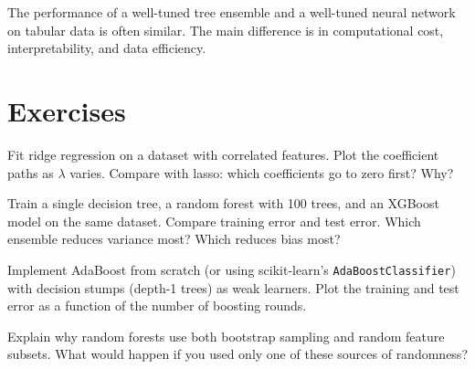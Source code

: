 \begin{principle}
	The performance of a well-tuned tree ensemble and a well-tuned neural network on tabular data is often similar. The main difference is in computational cost, interpretability, and data efficiency.
\end{principle}

\section{Exercises}

\begin{exercise}
	Fit ridge regression on a dataset with correlated features. Plot the coefficient paths as $\lambda$ varies. Compare with lasso: which coefficients go to zero first? Why?
\end{exercise}

\begin{exercise}
	Train a single decision tree, a random forest with 100 trees, and an XGBoost model on the same dataset. Compare training error and test error. Which ensemble reduces variance most? Which reduces bias most?
\end{exercise}

\begin{exercise}
	Implement AdaBoost from scratch (or using scikit-learn's \texttt{AdaBoostClassifier}) with decision stumps (depth-1 trees) as weak learners. Plot the training and test error as a function of the number of boosting rounds.
\end{exercise}

\begin{exercise}
	Explain why random forests use both bootstrap sampling and random feature subsets. What would happen if you used only one of these sources of randomness?
\end{exercise}
